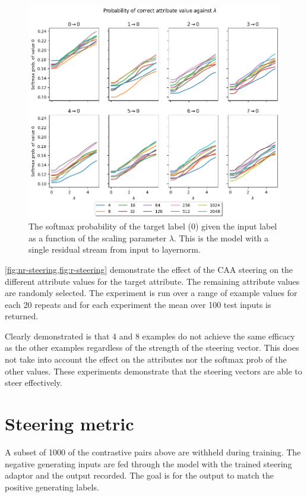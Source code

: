 \begin{figure}
    \centering
    \includegraphics[height=0.4\textheight]{figures/single-residual-steering.png}
    \caption{The softmax probability of the target label (0) given the input label as a function of the scaling parameter $\lambda$. This is the model with a single residual stream from input to layernorm.}
    \label{fig:sr-steering}
\end{figure}

\cref{fig:nr-steering,fig:r-steering} demonstrate the effect of the CAA steering on the different attribute values for the target attribute.
The remaining attribute values are randomly selected.
The experiment is run over a range of example values for each 20 repeats and for each experiment the mean over 100 test inputs is returned.

Clearly demonstrated is that 4 and 8 examples do not achieve the same efficacy as the other examples regardless of the strength of the steering vector.
This does not take into account the effect on the attributes nor the softmax prob of the other values.
These experiments demonstrate that the steering vectors are able to steer effectively.

\section{Steering metric}

A subset of 1000 of the contrastive pairs above are withheld during training.
The negative generating inputs are fed through the model with the trained steering adaptor and the output recorded.
The goal is for the output to match the positive generating labels.

